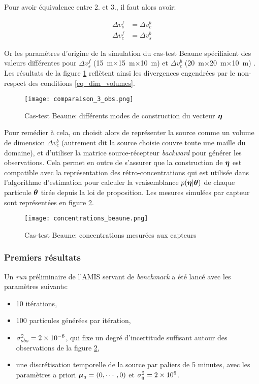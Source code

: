 Pour avoir équivalence entre 2. et 3., il faut alors avoir: 

\begin{equation}
\begin{split}
\Delta v_s^f &= \Delta v_c^b \\
\Delta v_c^f &= \Delta v_s^b
\end{split}
\label{eq_dim_volumes}
\end{equation}

Or les paramètres d'origine de la simulation du cas-test Beaune spécifiaient des valeurs différentes pour $\Delta v_s^f$ (\SI{15}{\meter}$\times$\SI{15}{\meter}$\times$\SI{10}{\meter}) et $\Delta v_c^b$ (\SI{20}{\meter}$\times$\SI{20}{\meter}$\times$\SI{10}{\meter}) . Les résultats de la figure \ref{fig_comparaison_3_obs} reflètent ainsi les divergences engendrées par le non-respect des conditions \eqref{eq_dim_volumes}.

\begin{figure}[h!]
	\centering
	\texttt{[image: comparaison\_3\_obs.png]}
	\caption{Cas-test Beaune: différents modes de construction du vecteur ${\bm{\eta}}$}
	\label{fig_comparaison_3_obs}
\end{figure}

Pour remédier à cela, on choisit alors de représenter la source comme un volume de dimension $\Delta v_c^b$ (autrement dit la source choisie couvre toute une maille du domaine), et d'utiliser la matrice source-récepteur \textit{backward} pour générer les observations. Cela permet en outre de s'assurer que la construction de ${\bm{\eta}}$ est compatible avec la représentation des rétro-concentrations qui est utilisée dans l'algorithme d'estimation pour calculer la vraisemblance $p({\bm{\eta}} | {\bm{\theta}})$ de chaque particule ${\bm{\theta}}$ tirée depuis la loi de proposition. Les mesures simulées par capteur sont représentées en figure \ref{fig_observations_25CAPTEURS}.

\begin{figure}[h!]
	\centering
	\texttt{[image: concentrations\_beaune.png]}
	\caption{Cas-test Beaune: concentrations mesurées aux capteurs}
	\label{fig_observations_25CAPTEURS}
\end{figure}

\subsubsection{Premiers résultats}

Un \textit{run} préliminaire de l'AMIS servant de \textit{benchmark} a été lancé avec les paramètres suivants:
\begin{itemize}
	\item 10 itérations,
	\item 100 particules générées par itération,
	\item ${\sigma_{obs}^2} = 2\times 10^{-6}$, qui fixe un degré d'incertitude suffisant autour des observations de la figure \ref{fig_observations_25CAPTEURS},
	\item une discrétisation temporelle de la source par paliers de 5 minutes, avec les paramètres a priori ${\bm{\mu}_q} = (0,\cdots,0)$ et $\sigma_q^2 = 2\times 10^6$.
\end{itemize}

